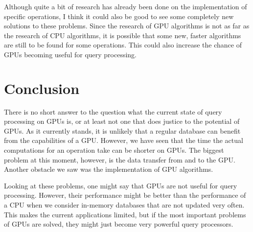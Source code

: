 \documentclass[a4paper,titlepage]{article}
\begin{document}
Although quite a bit of research has already been done on the implementation of specific operations, I think it could also be good to see some completely new solutions to these problems. Since the research of GPU algorithms is not as far as the research of CPU algorithms, it is possible that some new, faster algorithms are still to be found for some operations. This could also increase the chance of GPUs becoming useful for query processing.

\section{Conclusion}
\label{sec:conclusion}
There is no short answer to the question what the current state of query processing on GPUs is, or at least not one that does justice to the potential of GPUs. As it currently stands, it is unlikely that a regular database can benefit from the capabilities of a GPU. However, we have seen that the time the actual computations for an operation take can be shorter on GPUs. The biggest problem at this moment, however, is the data transfer from and to the GPU. Another obstacle we saw was the implementation of GPU algorithms. 

Looking at these problems, one might say that GPUs are not useful for query processing. However, their performance might be better than the performance of a CPU when we consider in-memory databases that are not updated very often. This makes the current applications limited, but if the most important problems of GPUs are solved, they might just become very powerful query processors.

{}

\end{document}

